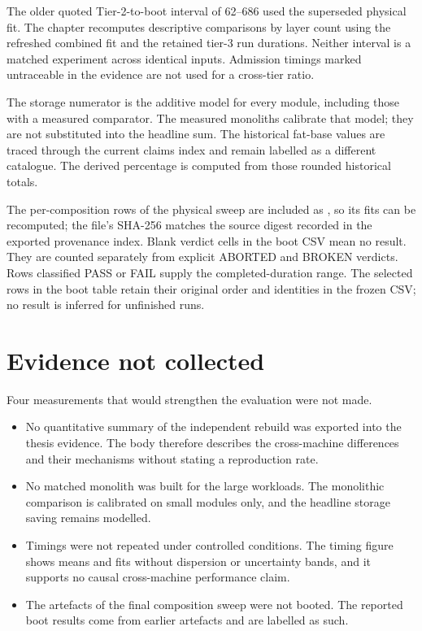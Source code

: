 The older quoted Tier-2-to-boot interval of \numrange{62}{686} used the superseded physical fit. The chapter recomputes descriptive comparisons by layer count using the refreshed combined fit and the retained tier-3 run durations. Neither interval is a matched experiment across identical inputs. Admission timings marked untraceable in the evidence are not used for a cross-tier ratio.

The storage numerator is the additive model for every module, including those with a measured comparator. The measured monoliths calibrate that model; they are not substituted into the headline sum. The historical fat-base values are traced through the current claims index and remain labelled as a different catalogue. The derived percentage is computed from those rounded historical totals.

The per-composition rows of the physical sweep are included as , so its fits can be recomputed; the file's SHA-256 matches the source digest recorded in the exported provenance index. Blank verdict cells in the boot CSV mean no result. They are counted separately from explicit ABORTED and BROKEN verdicts. Rows classified PASS or FAIL supply the completed-duration range. The selected rows in the boot table retain their original order and identities in the frozen CSV; no result is inferred for unfinished runs.

\section{Evidence not collected}

Four measurements that would strengthen the evaluation were not made.

\begin{itemize}
\item No quantitative summary of the independent rebuild was exported into the thesis evidence. The body therefore describes the cross-machine differences and their mechanisms without stating a reproduction rate.
\item No matched monolith was built for the large workloads. The monolithic comparison is calibrated on small modules only, and the headline storage saving remains modelled.
\item Timings were not repeated under controlled conditions. The timing figure shows means and fits without dispersion or uncertainty bands, and it supports no causal cross-machine performance claim.
\item The artefacts of the final composition sweep were not booted. The reported boot results come from earlier artefacts and are labelled as such.
\end{itemize}


